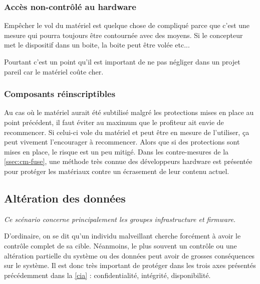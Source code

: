 \subsubsection{Accès non-contrôlé au hardware}

Empêcher le vol du matériel est quelque chose de compliqué parce que c'est une mesure qui pourra toujours être contournée avec des moyens. Si le concepteur met le dispositif dans un boite, la boite peut être volée etc...

Pourtant c'est un point qu'il est important de ne pas négliger dans un projet pareil car le matériel coûte cher.

\subsubsection{Composants réinscriptibles}

Au cas où le matériel aurait été subtilisé malgré les protections mises en place au point précédent, il faut éviter au maximum que le profiteur ait envie de recommencer. Si celui-ci vole du matériel et peut être en mesure de l'utiliser, ça peut vivement l'encourager à recommencer. Alors que si des protections sont mises en place, le risque est un peu mitigé. Dans les contre-mesures de la \autoref{ssec:cm-fuse}, une méthode très connue des développeurs hardware est présentée pour protéger les matériaux contre un écrasement de leur contenu actuel.
\clearpage


\subsection{Altération des données}

\emph{Ce scénario concerne principalement les groupes infrastructure et firmware.}
\medskip

D'ordinaire, on se dit qu'un individu malveillant cherche forcément à avoir le contrôle complet de sa cible. Néanmoins, le plus souvent un contrôle ou une altération partielle du système ou des données peut avoir de grosses conséquences sur le système. Il est donc très important de protéger dans les trois axes présentés précédemment dans la \autoref{cia} : confidentialité, intégrité, disponibilité.
\medskip

